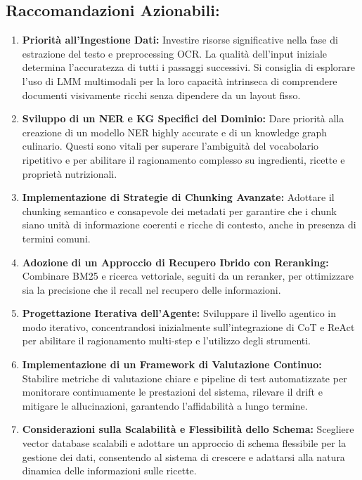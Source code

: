 \documentclass[a4paper, 11pt]{article}
\begin{document}
\subsection*{Raccomandazioni Azionabili:}
\begin{enumerate}[label=\arabic*.]
    \item \textbf{Priorità all'Ingestione Dati:} Investire risorse significative nella fase di estrazione del testo e preprocessing OCR. La qualità dell'input iniziale determina l'accuratezza di tutti i passaggi successivi. Si consiglia di esplorare l'uso di LMM multimodali per la loro capacità intrinseca di comprendere documenti visivamente ricchi senza dipendere da un layout fisso.
    \item \textbf{Sviluppo di un NER e KG Specifici del Dominio:} Dare priorità alla creazione di un modello NER highly accurate e di un knowledge graph culinario. Questi sono vitali per superare l'ambiguità del vocabolario ripetitivo e per abilitare il ragionamento complesso su ingredienti, ricette e proprietà nutrizionali.
    \item \textbf{Implementazione di Strategie di Chunking Avanzate:} Adottare il chunking semantico e consapevole dei metadati per garantire che i chunk siano unità di informazione coerenti e ricche di contesto, anche in presenza di termini comuni.
    \item \textbf{Adozione di un Approccio di Recupero Ibrido con Reranking:} Combinare BM25 e ricerca vettoriale, seguiti da un reranker, per ottimizzare sia la precisione che il recall nel recupero delle informazioni.
    \item \textbf{Progettazione Iterativa dell'Agente:} Sviluppare il livello agentico in modo iterativo, concentrandosi inizialmente sull'integrazione di CoT e ReAct per abilitare il ragionamento multi-step e l'utilizzo degli strumenti.
    \item \textbf{Implementazione di un Framework di Valutazione Continuo:} Stabilire metriche di valutazione chiare e pipeline di test automatizzate per monitorare continuamente le prestazioni del sistema, rilevare il drift e mitigare le allucinazioni, garantendo l'affidabilità a lungo termine.
    \item \textbf{Considerazioni sulla Scalabilità e Flessibilità dello Schema:} Scegliere vector database scalabili e adottare un approccio di schema flessibile per la gestione dei dati, consentendo al sistema di crescere e adattarsi alla natura dinamica delle informazioni sulle ricette.
\end{enumerate}



\end{document}
